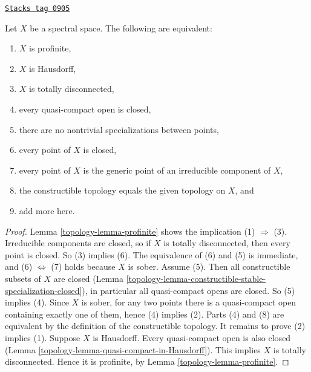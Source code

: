 \begin{lemma}
\label{topology-lemma-characterize-profinite-spectral}
\href{https://stacks.math.columbia.edu/tag/0905}{\texttt{Stacks tag 0905}}

Let $X$ be a spectral space. The following are equivalent:
\begin{enumerate}
\item $X$ is profinite,
\item $X$ is Hausdorff,
\item $X$ is totally disconnected,
\item every quasi-compact open is closed,
\item there are no nontrivial specializations between points,
\item every point of $X$ is closed,
\item every point of $X$ is the generic point of an irreducible component
of $X$,
\item the constructible topology equals the given topology on $X$, and
\item add more here.
\end{enumerate}
\end{lemma}

\begin{proof}

Lemma \ref{topology-lemma-profinite} shows the implication (1) $\Rightarrow$ (3).
Irreducible components are closed, so if $X$ is totally disconnected, then
every point is closed. So (3) implies (6). The equivalence of (6) and (5)
is immediate, and (6) $\Leftrightarrow$ (7) holds because $X$ is sober.
Assume (5). Then all constructible subsets of $X$ are closed
(Lemma \ref{topology-lemma-constructible-stable-specialization-closed}), in
particular all quasi-compact opens are closed. So (5) implies (4).
Since $X$ is sober, for any two points there is a quasi-compact open
containing exactly one of them, hence (4) implies (2).
Parts (4) and (8) are equivalent by the definition of the
constructible topology.
It remains to prove (2) implies (1). Suppose $X$ is Hausdorff. Every
quasi-compact open is also closed
(Lemma \ref{topology-lemma-quasi-compact-in-Hausdorff}). This implies $X$
is totally disconnected. Hence it is profinite, by
Lemma \ref{topology-lemma-profinite}.
\end{proof}

